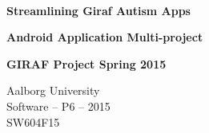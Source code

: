 
\begin{center}

	\vspace*{\fill}

	\hrulefill\newline \\

	\begin{LARGE}	
		\textbf{Streamlining Giraf Autism Apps}
	\end{LARGE}

	\vspace{0.6cm}

	\begin{Large}
		\textbf{Android Application Multi-project}
	\end{Large}

	\vspace{1cm}

	\begin{large} 
		\textbf{GIRAF Project Spring 2015}
	\end{large}

	\hrulefill\newline

	Aalborg University		\\
	Software -- P6 -- 2015	\\
	SW604F15				\\
    
	\vspace*{\fill}

\end{center}
\thispagestyle{empty}